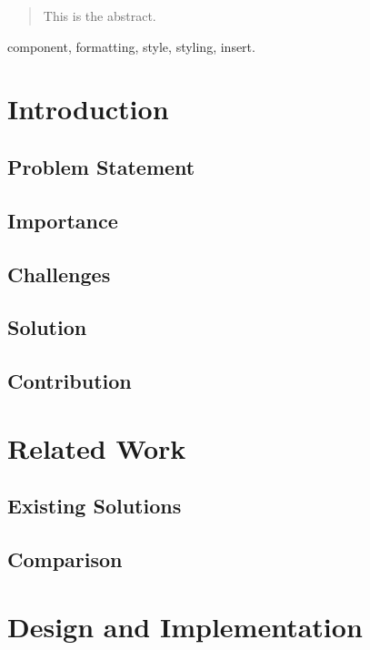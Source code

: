 \documentclass[conference]{IEEEtran}
\begin{document}
\maketitle

\begin{abstract}
    This is the abstract.
\end{abstract}

\begin{IEEEkeywords}
    component, formatting, style, styling, insert.
\end{IEEEkeywords}

\section{Introduction}

    \subsection{Problem Statement}

    \subsection{Importance}

    \subsection{Challenges}

    \subsection{Solution}

    \subsection{Contribution}

\section{Related Work}
    \subsection{Existing Solutions}
    \subsection{Comparison}

\section{Design and Implementation}
\end{document}
